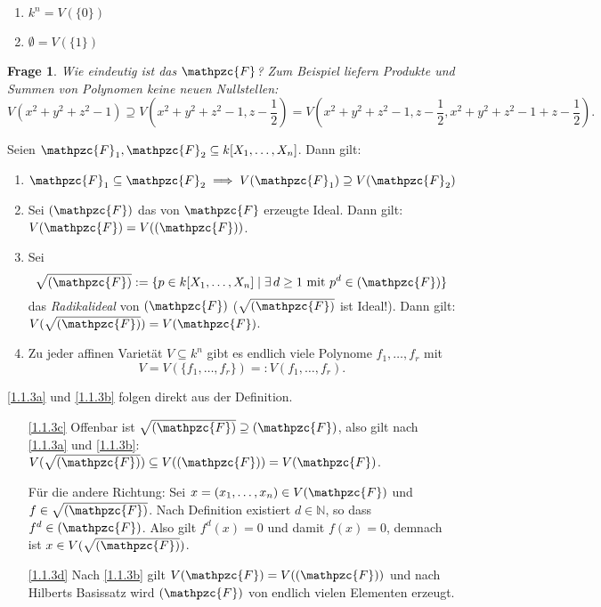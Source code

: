 \documentclass[a4paper,12pt]{scrbook}
\makeatletter
\theoremstyle{blah}
\newtheorem*{q}{Frage}
\theoremstyle{stz}
\renewcommand{\proofname}{Beweis}
\renewenvironment{proof}[1][\proofname]{\par
  \pushQED{\qed}%
  \normalfont \topsep6\p@\@plus6\p@\relax
  \trivlist
  \item[\hskip\labelsep
        \itshape
    #1\@addpunct{:}]\ignorespaces
}{%
  \popQED\endtrivlist\@endpefalse
}
\newcommand{\F}{\mathpzc{F}}
\newcommand{\leer}{\ensuremath{\emptyset}}
\newcommand{\set}[1]{\ensuremath{\mathbb{#1}}}
\newcommand{\N}{\set{N}}
\newcommand{\polyx}{\ensuremath%
  [X_{1},\dotsc,X_{n}]}
\makeatother
\begin{document}
\begin{bsp}\label{bsp1.2}
\begin{enumerate}
\item $k^{n}=V(\{0\})$
\item $\leer=V(\{1\})$
\end{enumerate}
\end{bsp}

\begin{q}Wie eindeutig ist das $\F$? Zum Beispiel liefern Produkte und Summen von Polynomen keine neuen Nullstellen:
\[V(x^{2}+y^{2}+z^{2}-1) \supseteq V(x^{2}+y^{2}+z^{2}-1, z-\frac{1}{2}) = V(x^{2}+y^{2}+z^{2}-1, z-\frac{1}{2}, x^{2}+y^{2}+z^{2}-1 + z-\frac{1}{2}).\]
\end{q}

\begin{bem} Seien $\F_{1},\F_{2}\subseteq k\polyx$. Dann gilt:
\begin{enumerate}
\item\label{1.1.3a} $\F_{1}\subseteq\F_{2}\implies V(\F_{1})\supseteq V(\F_{2})$
\item\label{1.1.3b} Sei $(\F)$ das von $\F$ erzeugte Ideal. Dann gilt: $V(\F) = V((\F))$.
\item\label{1.1.3c} Sei
\[\sqrt{(\F)}:=\{p\in k\polyx\mid\exists\, d\geq 1\text{ mit }p^{d}\in(\F)\}\]
das \emph{Radikalideal} von $(\F)$ ($\sqrt{(\F)}$ ist Ideal!). Dann gilt: $V(\sqrt{(\F)})=V(\F)$.
\item\label{1.1.3d} Zu jeder affinen Varietät $V\subseteq k^{n}$ gibt es endlich viele Polynome $f_{1},\dotsc,f_{r}$ mit \[V=V(\{f_{1},\dotsc,f_{r}\})=:V(f_{1},\dotsc,f_{r}).\]
\end{enumerate}
\end{bem}

\begin{proof}
\ref{1.1.3a} und \ref{1.1.3b} folgen direkt aus der Definition.
\begin{enumerate}%
\item[\ref{1.1.3c}] Offenbar ist $\sqrt{(\F)}\supseteq(\F)$, also gilt nach \ref{1.1.3a} und \ref{1.1.3b}: $V(\sqrt{(\F)})\subseteq V((\F))=V(\F)$.

Für die andere Richtung: Sei $x=(x_{1},\dotsc,x_{n})\in V(\F)$ und $f\in\sqrt{(\F)}$. Nach Definition existiert $d\in\N$, so dass $f^{d}\in(\F)$. Also gilt $f^{d}(x)=0$ und damit $f(x)=0$, demnach ist $x\in V(\sqrt{(\F)})$.
\item[\ref{1.1.3d}] Nach \ref{1.1.3b} gilt $V(\F)=V((\F))$ und nach Hilberts Basissatz wird $(\F)$ von endlich vielen Elementen erzeugt.\qedhere
\end{enumerate}
\end{proof}
\end{document}
